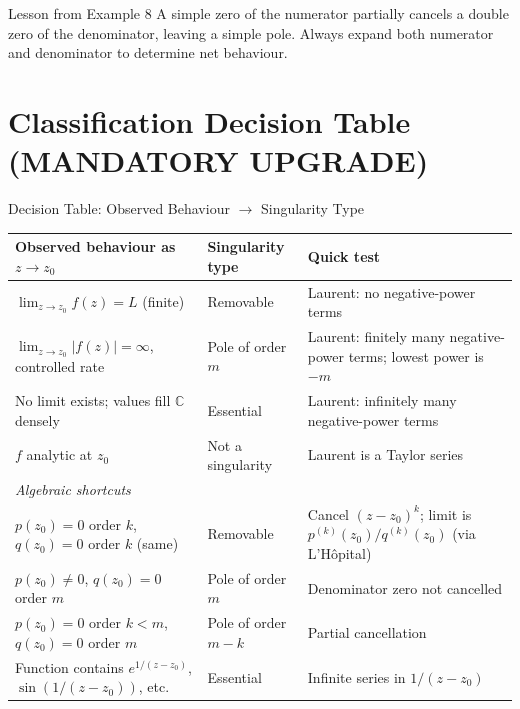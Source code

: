\documentclass[12pt,a4paper]{article}
\begin{document}
\begin{learnbox}{Lesson from Example 8}
A simple zero of the numerator partially cancels a double zero of the denominator, leaving a
simple pole. Always expand both numerator and denominator to determine net behaviour.
\end{learnbox}

\section{Classification Decision Table (MANDATORY UPGRADE)}

\begin{infobox}{Decision Table: Observed Behaviour $\to$ Singularity Type}
\begin{center}
\renewcommand{\arraystretch}{1.5}
\begin{tabular}{p{4.2cm} p{3.8cm} p{4.5cm}}
\toprule
\textbf{Observed behaviour as $z\to z_0$} & \textbf{Singularity type} & \textbf{Quick test} \\
\midrule
$\lim_{z\to z_0} f(z) = L$ (finite) & Removable & Laurent: no negative-power terms \\
$\lim_{z\to z_0} |f(z)| = \infty$, controlled rate & Pole of order $m$ & Laurent: finitely many negative-power terms; lowest power is $-m$ \\
No limit exists; values fill $\mathbb{C}$ densely & Essential & Laurent: infinitely many negative-power terms \\
$f$ analytic at $z_0$ & Not a singularity & Laurent is a Taylor series \\
\midrule
\multicolumn{3}{l}{\textit{Algebraic shortcuts}} \\
\midrule
$p(z_0)=0$ order $k$, $q(z_0)=0$ order $k$ (same) & Removable & Cancel $(z-z_0)^k$; limit is $p^{(k)}(z_0)/q^{(k)}(z_0)$ (via L'H\^opital) \\
$p(z_0)\neq 0$, $q(z_0)=0$ order $m$ & Pole of order $m$ & Denominator zero not cancelled \\
$p(z_0)=0$ order $k < m$, $q(z_0)=0$ order $m$ & Pole of order $m-k$ & Partial cancellation \\
Function contains $e^{1/(z-z_0)}$, $\sin(1/(z-z_0))$, etc. & Essential & Infinite series in $1/(z-z_0)$ \\
\bottomrule
\end{tabular}
\end{center}
\end{infobox}
\end{document}
